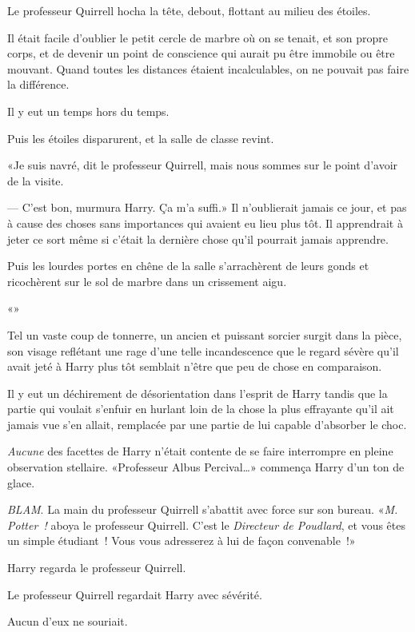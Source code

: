 Le professeur Quirrell hocha la tête, debout, flottant au milieu des étoiles.

Il était facile d'oublier le petit cercle de marbre où on se tenait, et son propre corps, et de devenir un point de conscience qui aurait pu être immobile ou être mouvant. Quand toutes les distances étaient incalculables, on ne pouvait pas faire la différence.

Il y eut un temps hors du temps.

Puis les étoiles disparurent, et la salle de classe revint.

«Je suis navré, dit le professeur Quirrell, mais nous sommes sur le point d'avoir de la visite.

--- C'est bon, murmura Harry. Ça m'a suffi.» Il n'oublierait jamais ce jour, et pas à cause des choses sans importances qui avaient eu lieu plus tôt. Il apprendrait à jeter ce sort même si c'était la dernière chose qu'il pourrait jamais apprendre.

Puis les lourdes portes en chêne de la salle s'arrachèrent de leurs gonds et ricochèrent sur le sol de marbre dans un crissement aigu.

«»

Tel un vaste coup de tonnerre, un ancien et puissant sorcier surgit dans la pièce, son visage reflétant une rage d'une telle incandescence que le regard sévère qu'il avait jeté à Harry plus tôt semblait n'être que peu de chose en comparaison.

Il y eut un déchirement de désorientation dans l'esprit de Harry tandis que la partie qui voulait s'enfuir en hurlant loin de la chose la plus effrayante qu'il ait jamais vue s'en allait, remplacée par une partie de lui capable d'absorber le choc.

\emph{Aucune} des facettes de Harry n'était contente de se faire interrompre en pleine observation stellaire. «Professeur Albus Percival…» commença Harry d'un ton de glace.

\emph{BLAM}. La main du professeur Quirrell s'abattit avec force sur son bureau. «\emph{M. Potter~!} aboya le professeur Quirrell. C'est le \emph{Directeur de Poudlard}, et vous êtes un simple étudiant~! Vous vous adresserez à lui de façon convenable~!»

Harry regarda le professeur Quirrell.

Le professeur Quirrell regardait Harry avec sévérité.

Aucun d'eux ne souriait.

